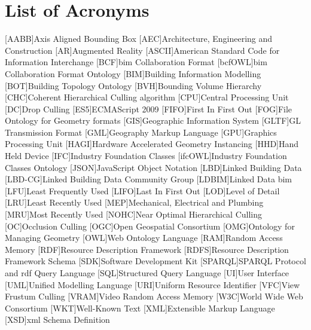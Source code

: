 \documentclass[12pt,a4paper,faculty=ea,language=en,doctype=report]{settings/ugent-doc}
\begin{document}
\chapter*{List of Acronyms}
\begin{acronym}[JSONP]\itemsep2pt\hypersetup{hidelinks}
  [AABB]{Axis Aligned Bounding Box}
  [AEC]{Architecture, Engineering and Construction}
  [AR]{Augmented Reality}
  [ASCII]{American Standard Code for Information Interchange}
  [BCF]{\acs{bim} Collaboration Format}
  [bcfOWL]{\acs{bim} Collaboration Format Ontology}
  [BIM]{Building Information Modelling}
  [BOT]{Building Topology Ontology}
  [BVH]{Bounding Volume Hierarchy}
  [CHC]{Coherent Hierarchical Culling algorithm}
  [CPU]{Central Processing Unit}
  [DC]{Drop Culling}
  [ES5]{ECMAScript 2009}
  [FIFO]{First In First Out}
  [FOG]{File Ontology for Geometry formats}
  [GIS]{Geographic Information System}
  [GLTF]{GL Transmission Format}
  [GML]{Geography Markup Language}
  [GPU]{Graphics Processing Unit}
  [HAGI]{Hardware Accelerated Geometry Instancing}
  [HHD]{Hand Held Device}
  [IFC]{Industry Foundation Classes}
  [ifcOWL]{Industry Foundation Classes Ontology}
  [JSON]{JavaScript Object Notation}
  [LBD]{Linked Building Data}
  [LBD-CG]{Linked Building Data Community Group}
  [LDBIM]{Linked Data \acs{bim}}
  [LFU]{Least Frequently Used}
  [LIFO]{Last In First Out}
  [LOD]{Level of Detail}
  [LRU]{Least Recently Used}
  [MEP]{Mechanical, Electrical and Plumbing}
  [MRU]{Most Recently Used}
  [NOHC]{Near Optimal Hierarchical Culling}
  [OC]{Occlusion Culling}
  [OGC]{Open Geospatial Consortium}
  [OMG]{Ontology for Managing Geometry}
  [OWL]{Web Ontology Language}
  [RAM]{Random Access Memory}
  [RDF]{Resource Description Framework}
  [RDFS]{Resource Description Framework Schema}
  [SDK]{Software Development Kit}
  [SPARQL]{SPARQL Protocol and \acs{rdf} Query Language}
  [SQL]{Structured Query Language}
  [UI]{User Interface}
  [UML]{Unified Modelling Language}
  [URI]{Uniform Resource Identifier}
  [VFC]{View Frustum Culling}
  [VRAM]{Video Random Access Memory}
  [W3C]{World Wide Web Consortium}
  [WKT]{Well-Known Text}
  [XML]{Extensible Markup Language}
  [XSD]{\ac{xml} Schema Definition}
\end{acronym}

\printbibliography[nottype=web_page, heading=bibintoc,title={References}]
\printbibliography[type=web_page, heading=bibintoc, title={Referenced websites}]


\appendix


\end{document}

